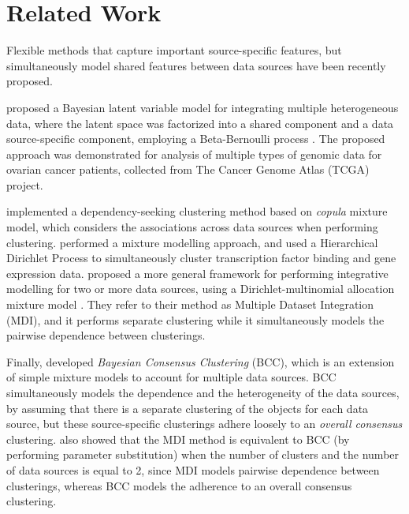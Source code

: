 \section{Related Work} \label{integr-related-work-sect}
Flexible methods that capture important source-specific features, but simultaneously model shared features between data sources have been recently proposed. 

\citet{Ray2012} proposed a Bayesian latent variable model for integrating multiple heterogeneous data, where the latent space was factorized into a shared component and a data source-specific component, employing a Beta-Bernoulli process \citep{Griffiths2005}. The proposed approach was demonstrated for analysis of multiple types of genomic data for ovarian cancer patients, collected from The Cancer Genome Atlas (TCGA) project.

\citet{Rey2012} implemented a dependency-seeking clustering method based on \emph{copula} mixture model, which considers the associations across data sources when performing clustering. \citet{Savage2010} performed a mixture modelling approach, and used a Hierarchical Dirichlet Process \citep{Ferguson1973, Escobar1995} to simultaneously cluster transcription factor binding and gene expression data. \citet{Kirk2012} proposed a more general framework for performing integrative modelling for two or more data sources, using a Dirichlet-multinomial allocation mixture model \citep{Green2001}. They refer to their method as Multiple Dataset Integration (MDI), and it performs separate clustering while it simultaneously models the pairwise dependence between clusterings. 

Finally, \citet{Lock2013} developed \emph{Bayesian Consensus Clustering} (BCC), which is an extension of simple mixture models to account for multiple data sources. BCC simultaneously models the dependence and the heterogeneity of the data sources, by assuming that there is a separate clustering of the objects for each data source, but these source-specific clusterings adhere loosely to an \emph{overall consensus} clustering. \citet{Lock2013} also showed that the MDI method is equivalent to BCC (by performing parameter substitution) when the number of clusters and the number of data sources is equal to 2, since MDI models pairwise dependence between clusterings, whereas BCC models the adherence to an overall consensus clustering.